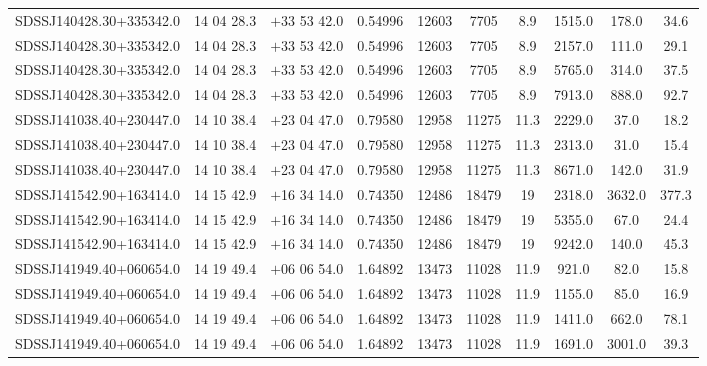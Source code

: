 \begin{landscape}
\begin{center}
\begin{longtable}{l c c c c c c c c c}
SDSSJ140428.30+335342.0  & 14 04 28.3  &         $+$33 53 42.0  &       0.54996  & 12603  &   7705  &       8.9  &       1515.0  &  178.0  &  34.6  \\
SDSSJ140428.30+335342.0  & 14 04 28.3  &         $+$33 53 42.0  &       0.54996  & 12603  &   7705  &       8.9  &       2157.0  &  111.0  &  29.1  \\
SDSSJ140428.30+335342.0  & 14 04 28.3  &         $+$33 53 42.0  &       0.54996  & 12603  &   7705  &       8.9  &       5765.0  &  314.0  &  37.5  \\
SDSSJ140428.30+335342.0  & 14 04 28.3  &         $+$33 53 42.0  &       0.54996  & 12603  &   7705  &       8.9  &       7913.0  &  888.0  &  92.7  \\
SDSSJ141038.40+230447.0  & 14 10 38.4  &         $+$23 04 47.0  &       0.79580  & 12958  &   11275  &      11.3  &      2229.0  &  37.0  &   18.2  \\
SDSSJ141038.40+230447.0  & 14 10 38.4  &         $+$23 04 47.0  &       0.79580  & 12958  &   11275  &      11.3  &      2313.0  &  31.0  &   15.4  \\
SDSSJ141038.40+230447.0  & 14 10 38.4  &         $+$23 04 47.0  &       0.79580  & 12958  &   11275  &      11.3  &      8671.0  &  142.0  &  31.9  \\
SDSSJ141542.90+163414.0  & 14 15 42.9  &         $+$16 34 14.0  &       0.74350  & 12486  &   18479  &      19  &        2318.0  &  3632.0  & 377.3  \\
SDSSJ141542.90+163414.0  & 14 15 42.9  &         $+$16 34 14.0  &       0.74350  & 12486  &   18479  &      19  &        5355.0  &  67.0  &   24.4  \\
SDSSJ141542.90+163414.0  & 14 15 42.9  &         $+$16 34 14.0  &       0.74350  & 12486  &   18479  &      19  &        9242.0  &  140.0  &  45.3  \\
SDSSJ141949.40+060654.0  & 14 19 49.4  &         $+$06 06 54.0  &       1.64892  & 13473  &   11028  &      11.9  &      921.0  &   82.0  &   15.8  \\
SDSSJ141949.40+060654.0  & 14 19 49.4  &         $+$06 06 54.0  &       1.64892  & 13473  &   11028  &      11.9  &      1155.0  &  85.0  &   16.9  \\
SDSSJ141949.40+060654.0  & 14 19 49.4  &         $+$06 06 54.0  &       1.64892  & 13473  &   11028  &      11.9  &      1411.0  &  662.0  &  78.1  \\
SDSSJ141949.40+060654.0  & 14 19 49.4  &         $+$06 06 54.0  &       1.64892  & 13473  &   11028  &      11.9  &      1691.0  &  3001.0  & 39.3  \\

\end{longtable}
\end{center}
\end{landscape}
